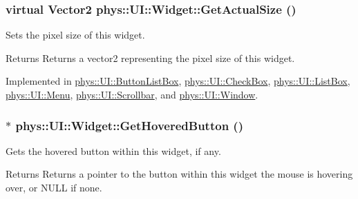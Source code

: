\hypertarget{classphys_1_1UI_1_1Widget_af3a685621ed220748c0940ea38c96ed2}{
\subsubsection[{GetActualSize}]{\setlength{\rightskip}{0pt plus 5cm}virtual {\bf Vector2} phys::UI::Widget::GetActualSize ()}}
\label{d9/d48/classphys_1_1UI_1_1Widget_af3a685621ed220748c0940ea38c96ed2}


Sets the pixel size of this widget. 

\begin{DoxyReturn}{Returns}
Returns a vector2 representing the pixel size of this widget. 
\end{DoxyReturn}


Implemented in \hyperlink{classphys_1_1UI_1_1ButtonListBox_a77d992f8858bf9b9eeb190dd1ea8a4fd}{phys::UI::ButtonListBox}, \hyperlink{classphys_1_1UI_1_1CheckBox_aa13946ced3947a13f8f30dd97ffba245}{phys::UI::CheckBox}, \hyperlink{classphys_1_1UI_1_1ListBox_a23133ed4a98994d838acee4c6a981e04}{phys::UI::ListBox}, \hyperlink{classphys_1_1UI_1_1Menu_af7566b83c50a4a02ac78d174d7c61817}{phys::UI::Menu}, \hyperlink{classphys_1_1UI_1_1Scrollbar_a2b3d791cbbe4c787f284d8b12a0edf27}{phys::UI::Scrollbar}, and \hyperlink{classphys_1_1UI_1_1Window_a22f5ca800e44c5e2cfeed59c243b03ed}{phys::UI::Window}.

\hypertarget{classphys_1_1UI_1_1Widget_ab563c13db418e4c3ff0a0dd766550251}{
\subsubsection[{GetHoveredButton}]{ $\ast$ phys::UI::Widget::GetHoveredButton ()}}
\label{d9/d48/classphys_1_1UI_1_1Widget_ab563c13db418e4c3ff0a0dd766550251}


Gets the hovered button within this widget, if any. 

\begin{DoxyReturn}{Returns}
Returns a pointer to the button within this widget the mouse is hovering over, or NULL if none. 
\end{DoxyReturn}



